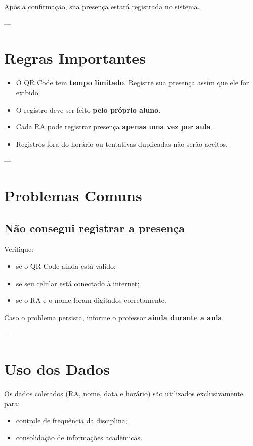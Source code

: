 \documentclass[12pt,a4paper]{article}
\begin{document}
Após a confirmação, sua presença estará registrada no sistema.

---

\section{Regras Importantes}

\begin{itemize}[noitemsep]
  \item O QR Code tem \textbf{tempo limitado}. Registre sua presença assim que ele for exibido.
  \item O registro deve ser feito \textbf{pelo próprio aluno}.
  \item Cada RA pode registrar presença \textbf{apenas uma vez por aula}.
  \item Registros fora do horário ou tentativas duplicadas não serão aceitos.
\end{itemize}

---

\section{Problemas Comuns}

\subsection*{Não consegui registrar a presença}
Verifique:
\begin{itemize}[noitemsep]
  \item se o QR Code ainda está válido;
  \item se seu celular está conectado à internet;
  \item se o RA e o nome foram digitados corretamente.
\end{itemize}

Caso o problema persista, informe o professor \textbf{ainda durante a aula}.

---

\section{Uso dos Dados}

Os dados coletados (RA, nome, data e horário) são utilizados exclusivamente para:
\begin{itemize}[noitemsep]
  \item controle de frequência da disciplina;
  \item consolidação de informações acadêmicas.
\end{itemize}
\end{document}
